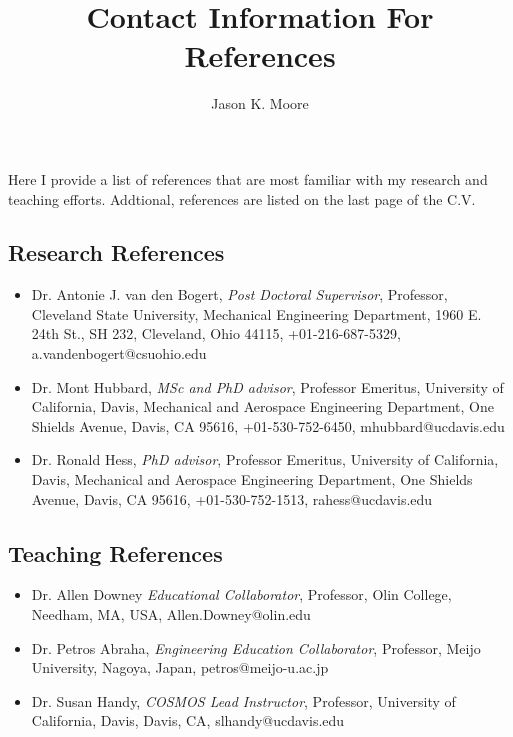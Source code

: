 \documentclass{article}
\title{Contact Information For References}
\author{Jason K. Moore}
\date{}
\begin{document}
\maketitle

Here I provide a list of references that are most familiar with my research and
teaching efforts. Addtional, references are listed on the last page of the C.V.

\subsection*{Research References}

\begin{itemize}
  \item Dr. Antonie J. van den Bogert,
    \emph{Post Doctoral Supervisor},
    Professor,
    Cleveland State University,
    Mechanical Engineering Department,
    1960 E. 24th St., SH 232,
    Cleveland, Ohio 44115,
    +01-216-687-5329,
    a.vandenbogert@csuohio.edu
  \item Dr. Mont Hubbard,
    \emph{MSc and PhD advisor},
    Professor Emeritus,
    University of California, Davis,
    Mechanical and Aerospace Engineering Department,
    One Shields Avenue, Davis, CA 95616,
    +01-530-752-6450,
    mhubbard@ucdavis.edu
  \item Dr. Ronald Hess,
    \emph{PhD advisor},
    Professor Emeritus,
    University of California, Davis,
    Mechanical and Aerospace Engineering Department,
    One Shields Avenue, Davis, CA 95616,
    +01-530-752-1513,
    rahess@ucdavis.edu
\end{itemize}

\subsection*{Teaching References}

\begin{itemize}
  \item Dr. Allen Downey
    \emph{Educational Collaborator},
    Professor,
    Olin College,
    Needham, MA, USA,
    Allen.Downey@olin.edu
  \item Dr. Petros Abraha,
    \emph{Engineering Education Collaborator},
    Professor,
    Meijo University,
    Nagoya, Japan,
    petros@meijo-u.ac.jp
  \item Dr. Susan Handy,
    \emph{COSMOS Lead Instructor},
    Professor,
    University of California, Davis,
    Davis, CA,
    slhandy@ucdavis.edu
\end{itemize}
\end{document}
